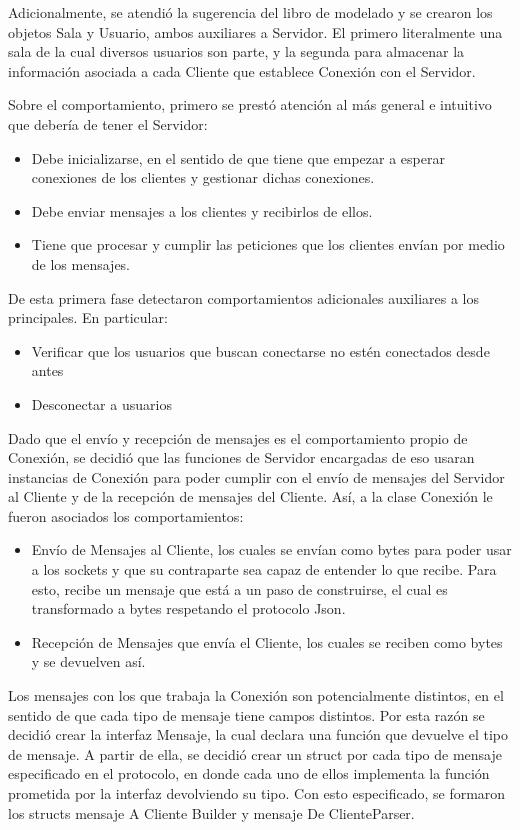 \documentclass[11pt, a4paper]{article}
\begin{document}
Adicionalmente, se atendió la sugerencia del libro de modelado y se crearon los objetos Sala y Usuario, ambos auxiliares a Servidor. El primero literalmente una sala de la cual diversos usuarios son parte, y la segunda para almacenar la información asociada a cada Cliente que establece Conexión con el Servidor.

Sobre el comportamiento, primero se prestó atención al más general e intuitivo que debería de tener el Servidor:
\begin{itemize}
    \item Debe inicializarse, en el sentido de que tiene que empezar a esperar conexiones de los clientes y gestionar dichas conexiones.
    \item Debe enviar mensajes a los clientes y recibirlos de ellos.
    \item Tiene que procesar y cumplir las peticiones que los clientes envían por medio de los mensajes.
\end{itemize}

De esta primera fase detectaron comportamientos adicionales auxiliares a los principales. En particular:
\begin{itemize}
    \item Verificar que los usuarios que buscan conectarse no estén conectados desde antes
    \item Desconectar a usuarios
\end{itemize}

Dado que el envío y recepción de mensajes es el comportamiento propio de Conexión, se decidió que las funciones de Servidor encargadas de eso usaran instancias de Conexión para poder cumplir con el envío de mensajes del Servidor al Cliente y de la recepción de mensajes del Cliente. Así, a la clase Conexión le fueron asociados los comportamientos:
\begin{itemize}
    \item Envío de Mensajes al Cliente, los cuales se envían como bytes para poder usar a los sockets y que su contraparte sea capaz de entender lo que recibe. Para esto, recibe un mensaje que está a un paso de construirse, el cual es transformado a bytes respetando el protocolo Json.
    \item Recepción de Mensajes que envía el Cliente, los cuales se reciben como bytes y se devuelven así.
\end{itemize}

Los mensajes con los que trabaja la Conexión son potencialmente distintos, en el sentido de que cada tipo de mensaje tiene campos distintos. Por esta razón se decidió crear la interfaz Mensaje, la cual declara una función que devuelve el tipo de mensaje. A partir de ella, se decidió crear un struct por cada tipo de mensaje especificado en el protocolo, en donde cada uno de ellos implementa la función prometida por la interfaz devolviendo su tipo. Con esto especificado, se formaron los structs mensaje A Cliente Builder y mensaje De ClienteParser.
\end{document}
